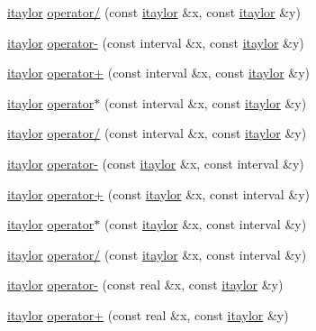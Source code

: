 \begin{DoxyCompactItemize}
\item 
\hyperlink{classtaylor_1_1itaylor}{itaylor} \hyperlink{namespacetaylor_a782087dc9a12d1b6eb6ecd189b7454f8}{operator/} (const \hyperlink{classtaylor_1_1itaylor}{itaylor} \&x, const \hyperlink{classtaylor_1_1itaylor}{itaylor} \&y)
\item 
\hyperlink{classtaylor_1_1itaylor}{itaylor} \hyperlink{namespacetaylor_ac0be684300be0c2c140b5f21a18a021d}{operator-\/} (const interval \&x, const \hyperlink{classtaylor_1_1itaylor}{itaylor} \&y)
\item 
\hyperlink{classtaylor_1_1itaylor}{itaylor} \hyperlink{namespacetaylor_a0ccc4b187f19c84e174cff0e0415baf9}{operator+} (const interval \&x, const \hyperlink{classtaylor_1_1itaylor}{itaylor} \&y)
\item 
\hyperlink{classtaylor_1_1itaylor}{itaylor} \hyperlink{namespacetaylor_a852eb06a98b349480553d8124724dbc0}{operator$\ast$} (const interval \&x, const \hyperlink{classtaylor_1_1itaylor}{itaylor} \&y)
\item 
\hyperlink{classtaylor_1_1itaylor}{itaylor} \hyperlink{namespacetaylor_a38d9e25f2193b6de0fb6a5a235c4a617}{operator/} (const interval \&x, const \hyperlink{classtaylor_1_1itaylor}{itaylor} \&y)
\item 
\hyperlink{classtaylor_1_1itaylor}{itaylor} \hyperlink{namespacetaylor_a5fbafc16645c05d60634be3ba1ae75fe}{operator-\/} (const \hyperlink{classtaylor_1_1itaylor}{itaylor} \&x, const interval \&y)
\item 
\hyperlink{classtaylor_1_1itaylor}{itaylor} \hyperlink{namespacetaylor_a73e071be2c515e2213963c5d4adfd978}{operator+} (const \hyperlink{classtaylor_1_1itaylor}{itaylor} \&x, const interval \&y)
\item 
\hyperlink{classtaylor_1_1itaylor}{itaylor} \hyperlink{namespacetaylor_a464e53f823f12c772db53cf1a34583d6}{operator$\ast$} (const \hyperlink{classtaylor_1_1itaylor}{itaylor} \&x, const interval \&y)
\item 
\hyperlink{classtaylor_1_1itaylor}{itaylor} \hyperlink{namespacetaylor_aa35f5bbbbd3b7efecf6db9a0900e3a58}{operator/} (const \hyperlink{classtaylor_1_1itaylor}{itaylor} \&x, const interval \&y)
\item 
\hyperlink{classtaylor_1_1itaylor}{itaylor} \hyperlink{namespacetaylor_aea48d1e448300b1b05ce34a3c9228fd6}{operator-\/} (const real \&x, const \hyperlink{classtaylor_1_1itaylor}{itaylor} \&y)
\item 
\hyperlink{classtaylor_1_1itaylor}{itaylor} \hyperlink{namespacetaylor_a401f53ac76107b6d9b890b4b0ecbd423}{operator+} (const real \&x, const \hyperlink{classtaylor_1_1itaylor}{itaylor} \&y)

\end{DoxyCompactItemize}
